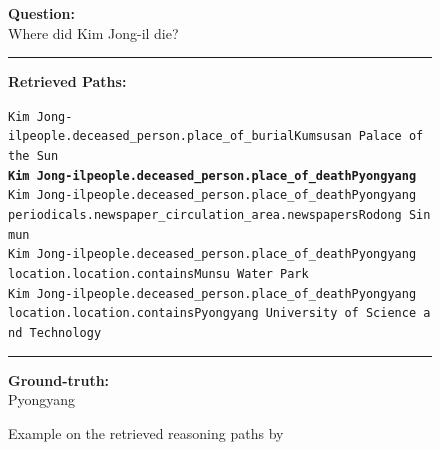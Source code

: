 \begin{figure}[t]
\begin{tcolorbox}[colback=gray!5!white,
                  colframe=gray!75!black,
                  title=WEBQSP-WebQTest-1599]
\scriptsize

\textbf{Question:}\\
Where did Kim Jong-il die?

\rule{\linewidth}{0.4pt}

\textbf{Retrieved Paths:}\\[2pt]
{\raggedright
\texttt{Kim Jong-il\patharrow people.deceased\_person.place\_of\_burial\patharrow Kumsusan Palace of the Sun}\\[6pt]

\texttt{\textbf{Kim Jong-il\patharrow people.deceased\_person.place\_of\_death\patharrow Pyongyang}}\\[6pt]

\texttt{Kim Jong-il\patharrow people.deceased\_person.place\_of\_death\patharrow Pyongyang\patharrow \\ periodicals.newspaper\_circulation\_area.newspapers\patharrow Rodong Sinmun}\\[6pt]

\texttt{Kim Jong-il\patharrow people.deceased\_person.place\_of\_death\patharrow Pyongyang\patharrow \\ location.location.contains\patharrow Munsu Water Park}\\[6pt]

\texttt{Kim Jong-il\patharrow people.deceased\_person.place\_of\_death\patharrow Pyongyang\patharrow \\ location.location.contains\patharrow Pyongyang University of Science and Technology}\\[6pt]

\par}

\rule{\linewidth}{0.4pt}

\textbf{Ground-truth:}\\
Pyongyang

\end{tcolorbox}
\caption{Example on the retrieved reasoning paths by \proj}
\label{fig:example4}
\end{figure}


